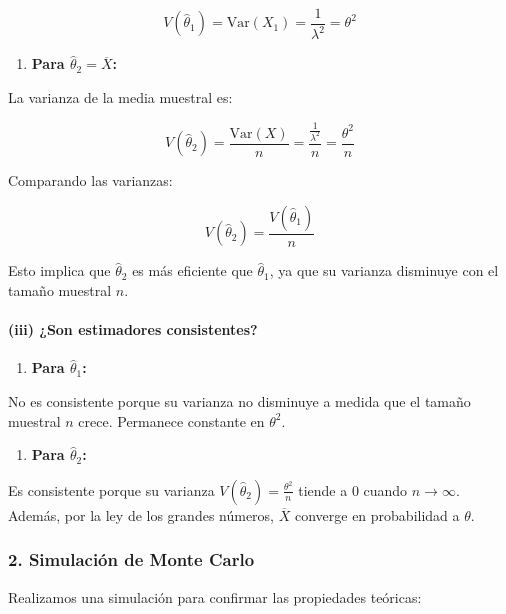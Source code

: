 \documentclass[
]{article}
\providecommand{\tightlist}{%
  \setlength{\itemsep}{0pt}\setlength{\parskip}{0pt}}
\begin{document}
\[
V(\hat\theta_1) = \text{Var}(X_1) = \frac{1}{\lambda^2} = \theta^2
\]

\begin{enumerate}
\def\labelenumi{\arabic{enumi}.}
\setcounter{enumi}{1}
\tightlist
\item
  \textbf{Para \(\hat\theta_2 = \overline{X}\):}
\end{enumerate}

La varianza de la media muestral es:

\[
V(\hat\theta_2) = \frac{\text{Var}(X)}{n} = \frac{\frac{1}{\lambda^2}}{n} = \frac{\theta^2}{n}
\]

Comparando las varianzas:

\[
V(\hat\theta_2) = \frac{V(\hat\theta_1)}{n}
\]

Esto implica que \(\hat\theta_2\) es más eficiente que \(\hat\theta_1\), ya que su varianza disminuye con el tamaño muestral \(n\).

\paragraph{(iii) ¿Son estimadores consistentes?}\label{iii-son-estimadores-consistentes}

\begin{enumerate}
\def\labelenumi{\arabic{enumi}.}
\tightlist
\item
  \textbf{Para \(\hat\theta_1\):}
\end{enumerate}

No es consistente porque su varianza no disminuye a medida que el tamaño muestral \(n\) crece. Permanece constante en \(\theta^2\).

\begin{enumerate}
\def\labelenumi{\arabic{enumi}.}
\setcounter{enumi}{1}
\tightlist
\item
  \textbf{Para \(\hat\theta_2\):}
\end{enumerate}

Es consistente porque su varianza \(V(\hat\theta_2) = \frac{\theta^2}{n}\) tiende a 0 cuando \(n \to \infty\). Además, por la ley de los grandes números, \(\overline{X}\) converge en probabilidad a \(\theta\).

\subsubsection{2. Simulación de Monte Carlo}\label{simulaciuxf3n-de-monte-carlo}

Realizamos una simulación para confirmar las propiedades teóricas:
\end{document}
